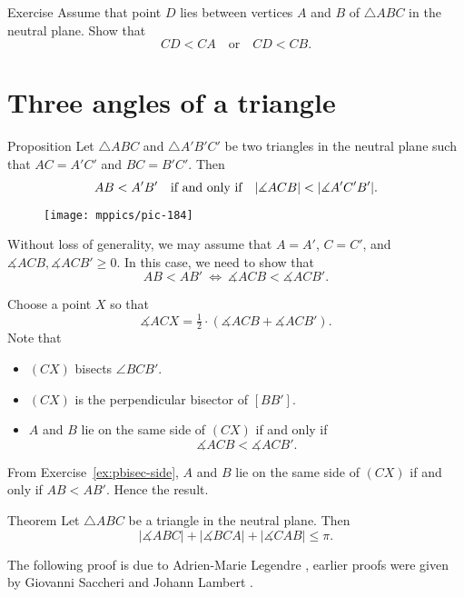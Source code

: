 \begin{thm}{Exercise}\label{ex:chev<side}
Assume that point $D$ lies between vertices $A$ and $B$ of $\triangle ABC$ in the neutral plane.
Show that 
$$CD<CA
\quad
\text{or}
\quad
CD<CB.$$

\end{thm}

\section{Three angles of a triangle}

\begin{thm}{Proposition}\label{prop:angle-side}
Let $\triangle ABC$ and $\triangle A'B'C'$ be two triangles in the neutral plane
such that $AC=A'C'$ and $BC=B'C'$.
Then 
$$AB\z<A'B'
\quad
\text{if and only if}
\quad 
|\measuredangle ACB|<|\measuredangle A'C'B'|.$$

\end{thm}

\begin{wrapfigure}{o}{38mm}
\vskip-6mm
\centering
\texttt{[image: mppics/pic-184]}
\end{wrapfigure}

Without loss of generality, we may assume that $A=A'$, $C=C'$, and $\measuredangle ACB,\measuredangle ACB'\ge 0$.
In this case, we need to show that 
$$AB<AB'
\ 
\iff
\  
\measuredangle ACB<\measuredangle ACB'.$$

Choose a point $X$ so that 
$$\measuredangle ACX=\tfrac12\cdot(\measuredangle ACB+\measuredangle ACB').$$
Note that 
\begin{itemize}
\item $(CX)$ bisects $\angle BCB'$.
\item $(CX)$ is the perpendicular bisector of $[BB']$.
\item $A$ and $B$ lie on the same side of $(CX)$ if and only if $$\measuredangle ACB<\measuredangle ACB'.$$
\end{itemize}
From Exercise~\ref{ex:pbisec-side}, $A$ and $B$ lie on the same side of $(CX)$ if and only if $AB<AB'$.
Hence the result.
\qeds

\begin{thm}{Theorem}\label{thm:3sum-a}
Let $\triangle ABC$ be a triangle in the neutral plane.
Then 
$$|\measuredangle ABC|+|\measuredangle BCA|+|\measuredangle CAB|\le \pi.$$

\end{thm}

The following proof is due to Adrien-Marie Legendre \cite{legendre}, 
earlier proofs were given by Giovanni Saccheri \cite{saccheri}
and Johann Lambert \cite{lambert}.

